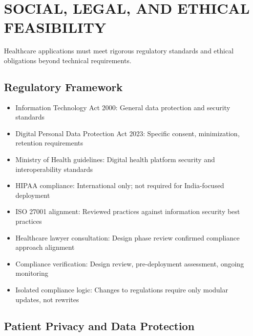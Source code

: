 \documentclass[12pt,a4paper]{report}
\begin{document}
\section{SOCIAL, LEGAL, AND ETHICAL FEASIBILITY}

Healthcare applications must meet rigorous regulatory standards and ethical obligations beyond technical requirements.

\subsection{Regulatory Framework}

\begin{itemize}
  \item Information Technology Act 2000: General data protection and security standards
  \item Digital Personal Data Protection Act 2023: Specific consent, minimization, retention requirements
  \item Ministry of Health guidelines: Digital health platform security and interoperability standards
  \item HIPAA compliance: International only; not required for India-focused deployment
  \item ISO 27001 alignment: Reviewed practices against information security best practices
  \item Healthcare lawyer consultation: Design phase review confirmed compliance approach alignment
  \item Compliance verification: Design review, pre-deployment assessment, ongoing monitoring
  \item Isolated compliance logic: Changes to regulations require only modular updates, not rewrites
\end{itemize}

\subsection{Patient Privacy and Data Protection}
\end{document}
